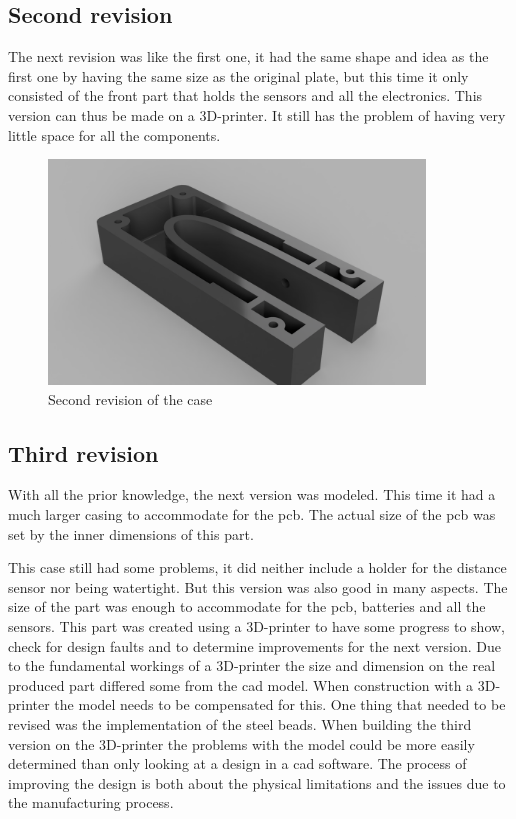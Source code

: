 \subsection{Second revision}
The next revision was like the first one, it had the same shape and idea as the first one by having the same size as the original plate, but this time it only consisted of the front part that holds the sensors and all the electronics. This version can thus be made on a 3D-printer. It still has the problem of having very little space for all the components.    

\begin{figure}[H]
\begin{center}
	\includegraphics[width = 10cm]{Figures/Case_rev_2.png}
	\caption{Second revision of the case}
	\label{Case_rev_2}
\end{center}
\end{figure}

\subsection{Third revision}
With all the prior knowledge, the next version was modeled. This time it had a much larger casing to accommodate for the \gls{pcb}. The actual size of the \gls{pcb} was set by the inner dimensions of this part.  

This case still had some problems, it did neither include a holder for the distance sensor nor being watertight. But this version was also good in many aspects. The size of the part was enough to accommodate for the \gls{pcb}, batteries and all the sensors.  
This part was created using a 3D-printer to have some progress to show, check for design faults and to determine improvements for the next version.  
Due to the fundamental workings of a 3D-printer the size and dimension on the real produced part differed some from the \gls{cad} model. When construction with a 3D-printer the model needs to be compensated for this. One thing that needed to be revised was the implementation of the steel beads.  
When building the third version on the 3D-printer the problems with the model could be more easily determined than only looking at a design in a \gls{cad} software. The process of improving the design is both about the physical limitations and the issues  due to the manufacturing process. 

